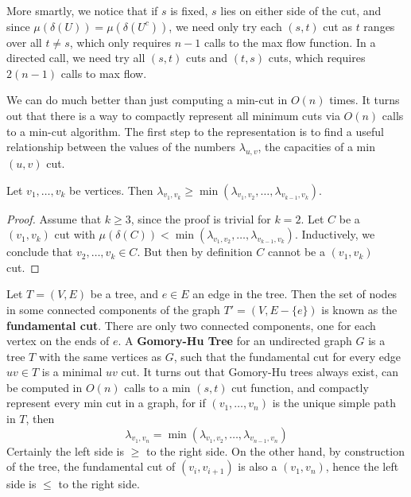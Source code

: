More smartly, we notice that if $s$ is fixed, $s$ lies on either side of the cut, and since $\mu(\delta(U)) = \mu(\delta(U^c))$, we need only try each $(s,t)$ cut as $t$ ranges over all $t \neq s$, which only requires $n-1$ calls to the max flow function. In a directed call, we need try all $(s,t)$ cuts and $(t,s)$ cuts, which requires $2(n-1)$ calls to max flow.

We can do much better than just computing a min-cut in $O(n)$ times. It turns out that there is a way to compactly represent all minimum cuts via $O(n)$ calls to a min-cut algorithm. The first step to the representation is to find a useful relationship between the values of the numbers $\lambda_{u,v}$, the capacities of a min $(u,v)$ cut.

\begin{lemma}
    Let $v_1, \dots, v_k$ be vertices. Then $\lambda_{v_1, v_k} \geq \min(\lambda_{v_1,v_2}, \dots, \lambda_{v_{k-1},v_k})$.
\end{lemma}
\begin{proof}
    Assume that $k \geq 3$, since the proof is trivial for $k = 2$. Let $C$ be a $(v_1,v_k)$ cut with $\mu(\delta(C)) < \min(\lambda_{v_1,v_2}, \dots, \lambda_{v_{k-1},v_k})$. Inductively, we conclude that $v_2, \dots, v_k \in C$. But then by definition $C$ cannot be a $(v_1, v_k)$ cut.
\end{proof}

Let $T = (V,E)$ be a tree, and $e \in E$ an edge in the tree. Then the set of nodes in some connected components of the graph $T' = (V, E - \{ e \})$ is known as the {\bf fundamental cut}. There are only two connected components, one for each vertex on the ends of $e$. A {\bf Gomory-Hu Tree} for an undirected graph $G$ is a tree $T$ with the same vertices as $G$, such that the fundamental cut for every edge $uv \in T$ is a minimal $uv$ cut. It turns out that Gomory-Hu trees always exist, can be computed in $O(n)$ calls to a min $(s,t)$ cut function, and compactly represent every min cut in a graph, for if $(v_1, \dots, v_n)$ is the unique simple path in $T$, then
%
\[ \lambda_{v_1,v_n} = \min(\lambda_{v_1,v_2}, \dots, \lambda_{v_{n-1},v_n}) \]
%
Certainly the left side is $\geq$ to the right side. On the other hand, by construction of the tree, the fundamental cut of $(v_i,v_{i+1})$ is also a $(v_1,v_n)$, hence the left side is $\leq$ to the right side.

